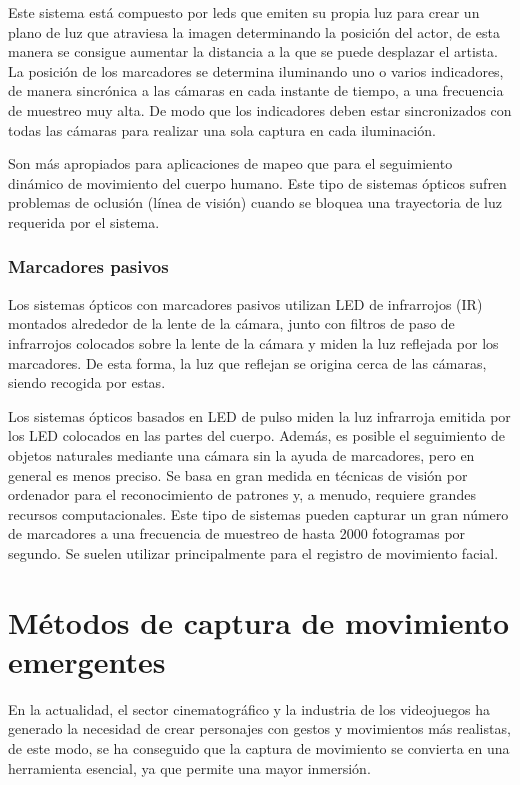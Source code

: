 Este sistema está compuesto por leds que emiten su propia luz para crear un plano de luz que atraviesa la imagen determinando la posición del actor, de esta manera se consigue aumentar la distancia a la que se puede desplazar el artista. La posición de los marcadores se determina iluminando uno o varios indicadores, de manera sincrónica a las cámaras en cada instante de tiempo, a una frecuencia de muestreo muy alta. De modo que los indicadores deben estar sincronizados con todas las cámaras para realizar una sola captura en cada iluminación. 

Son más apropiados para aplicaciones de mapeo que para el seguimiento dinámico de movimiento del cuerpo humano. Este tipo de sistemas ópticos sufren problemas de oclusión (línea de visión) cuando se bloquea una trayectoria de luz requerida por el sistema.

\subsubsection{Marcadores pasivos}

Los sistemas ópticos con marcadores pasivos utilizan LED de infrarrojos (IR) montados alrededor de la lente de la cámara, junto con filtros de paso de infrarrojos colocados sobre la lente de la cámara y miden la luz reflejada por los marcadores. De esta forma, la luz que reflejan se origina cerca de las cámaras, siendo recogida por estas. 

Los sistemas ópticos basados en LED de pulso miden la luz infrarroja emitida por los LED colocados en las partes del cuerpo. Además, es posible el seguimiento de objetos naturales mediante una cámara sin la ayuda de marcadores, pero en general es menos preciso. Se basa en gran medida en técnicas de visión por ordenador para el reconocimiento de patrones y, a menudo, requiere grandes recursos computacionales. Este tipo de sistemas pueden capturar un gran número de marcadores a una frecuencia de muestreo de hasta 2000 fotogramas por segundo. Se suelen utilizar principalmente para el registro de movimiento facial. 

\section{Métodos de captura de movimiento emergentes}

En la actualidad, el sector cinematográfico y la industria de los videojuegos ha generado la necesidad de crear personajes con gestos y movimientos más realistas, de este modo, se ha conseguido que la captura de movimiento se convierta en una herramienta esencial, ya que permite una mayor inmersión. 

